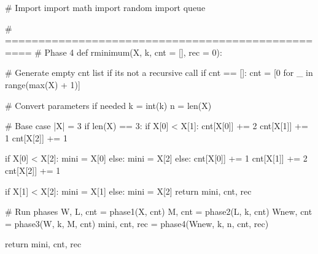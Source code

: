 \begin{python}
#   Import
import math
import random
import queue

# ==================================================
#   Phase 4
def rminimum(X, k, cnt = [], rec = 0):

	# Generate empty cnt list if its not a recursive call
    if cnt == []:
        cnt = [0 for _ in range(max(X) + 1)]

    # Convert parameters if needed
    k = int(k)
    n = len(X)

    # Base case |X| = 3
    if len(X) == 3:
        if X[0] < X[1]:
            cnt[X[0]] += 2
            cnt[X[1]] += 1
            cnt[X[2]] += 1

            if X[0] < X[2]:
                mini = X[0]
            else:
                mini = X[2]
        else:
            cnt[X[0]] += 1
            cnt[X[1]] += 2
            cnt[X[2]] += 1

            if X[1] < X[2]:
                mini = X[1]
            else:
                mini = X[2]
        return mini, cnt, rec

    # Run phases
    W, L, cnt = phase1(X, cnt)
    M, cnt = phase2(L, k, cnt)
    Wnew, cnt = phase3(W, k, M, cnt)
    mini, cnt, rec = phase4(Wnew, k, n, cnt, rec)

    return mini, cnt, rec
\end{python}